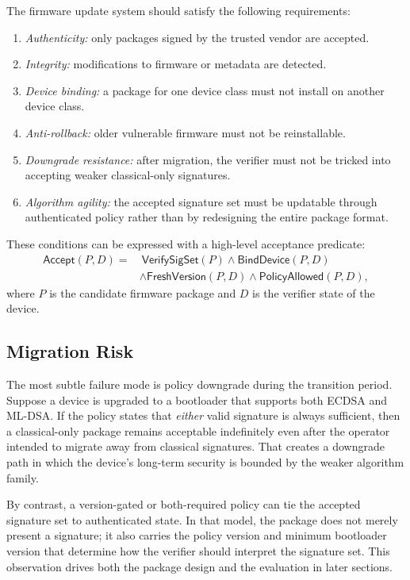 The firmware update system should satisfy the following requirements:
\begin{enumerate}
\item \textit{Authenticity:} only packages signed by the trusted vendor are accepted.
\item \textit{Integrity:} modifications to firmware or metadata are detected.
\item \textit{Device binding:} a package for one device class must not install on another device class.
\item \textit{Anti-rollback:} older vulnerable firmware must not be reinstallable.
\item \textit{Downgrade resistance:} after migration, the verifier must not be tricked into accepting weaker classical-only signatures.
\item \textit{Algorithm agility:} the accepted signature set must be updatable through authenticated policy rather than by redesigning the entire package format.
\end{enumerate}

These conditions can be expressed with a high-level acceptance predicate:
\begin{equation}
\begin{aligned}
\mathsf{Accept}(P,D) = &\ \mathsf{VerifySigSet}(P) \land \mathsf{BindDevice}(P,D) \\
&\land \mathsf{FreshVersion}(P,D) \land \mathsf{PolicyAllowed}(P,D),
\end{aligned}
\label{eq:acceptance}
\end{equation}
where $P$ is the candidate firmware package and $D$ is the verifier state of the device.

\subsection{Migration Risk}

The most subtle failure mode is policy downgrade during the transition period. Suppose a device is upgraded to a bootloader that supports both ECDSA and ML-DSA. If the policy states that \textit{either} valid signature is always sufficient, then a classical-only package remains acceptable indefinitely even after the operator intended to migrate away from classical signatures. That creates a downgrade path in which the device's long-term security is bounded by the weaker algorithm family.

By contrast, a version-gated or both-required policy can tie the accepted signature set to authenticated state. In that model, the package does not merely present a signature; it also carries the policy version and minimum bootloader version that determine how the verifier should interpret the signature set. This observation drives both the package design and the evaluation in later sections.
